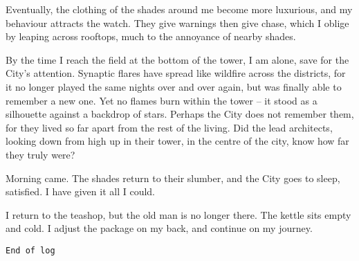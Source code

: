Eventually, the clothing of the shades around me become more luxurious, and my behaviour attracts the watch. They give warnings then give chase, which I oblige by leaping across rooftops, much to the annoyance of nearby shades.

By the time I reach the field at the bottom of the tower, I am alone, save for the City’s attention. Synaptic flares have spread like wildfire across the districts, for it no longer played the same nights over and over again, but was finally able to remember a new one. Yet no flames burn within the tower -- it stood as a silhouette against a backdrop of stars. Perhaps the City does not remember them, for they lived so far apart from the rest of the living. Did the lead architects, looking down from high up in their tower, in the centre of the city, know how far they truly were?

Morning came. The shades return to their slumber, and the City goes to sleep, satisfied. I have given it all I could. 

I return to the teashop, but the old man is no longer there. The kettle sits empty and cold. I adjust the package on my back, and continue on my journey.

\begin{center}
    \texttt{End of log}
\end{center}
\text{ }